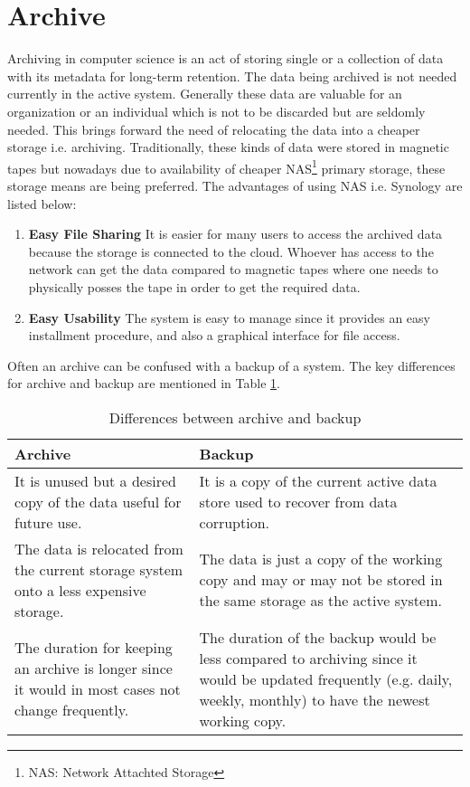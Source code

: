 \section{Archive}
Archiving in computer science is an act of storing single or a collection of data with its metadata for long-term retention. The data being archived is 
not needed currently in the active system. Generally these data are valuable for an organization or an individual which is not to be discarded but are seldomly needed. 
This brings forward the need of relocating the data into a cheaper storage i.e. archiving. Traditionally, these kinds of data were stored in magnetic tapes but nowadays 
due to availability of cheaper NAS\footnote{NAS: Network Attachted Storage} primary storage, 
these storage means are being preferred. 
The advantages of using NAS i.e. Synology \cite{Synology} are listed below:
\begin{enumerate}
    \item \textbf{Easy File Sharing} It is easier for many users to access the archived data because the storage is connected to the cloud. Whoever has access to the
    network can get the data compared to magnetic tapes where one needs to physically posses the tape in order to get the required data.
    \item \textbf{Easy Usability} The system is easy to manage since it provides an easy installment procedure, and also a graphical interface for file access.
\end{enumerate}
Often an archive can be confused
with a backup of a system. The key differences for archive and backup are mentioned in Table \ref{table:archiveVsBackup}.

\begin{table}[H]
    \centering
    \begin{tabular}{|p{7cm}|p{7cm}|}
        \hline
            \textbf{Archive}  & \textbf{Backup}\\
        \hline
            It is unused but a desired copy of the data useful for future use.& 
            It is a copy of the current active data store used to recover from data corruption. \\
        \hline
            The data is relocated from the current storage system onto a less expensive storage.
            & The data is just a copy of the working copy and may or may not be stored in the same storage as the active system.\\
        \hline
             The duration for keeping an archive is longer since it would in most cases not change frequently.
             & The duration of the backup would be less compared to archiving since it would be updated frequently (e.g. daily, weekly, monthly) to have the newest 
             working copy.\\
        \hline
    \end{tabular}
    \caption{Differences between archive and backup}
    \label{table:archiveVsBackup}     
\end{table}    